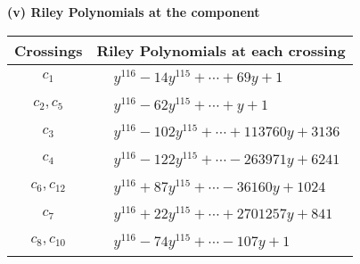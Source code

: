 \documentclass[1p]{elsarticle_modified}
\theoremstyle{definition}
\begin{document}
\newpage\renewcommand{\arraystretch}{1}
\flushleft \textbf{(v) Riley Polynomials at the component}\newline \\
\begin{tabular}{m{50pt}|m{274pt}}
Crossings & \hspace{64pt}Riley Polynomials at each crossing \\
\hline $$\begin{aligned}c_{1}\end{aligned}$$&$\begin{aligned}
&y^{116}-14 y^{115}+\cdots+69 y+1
\end{aligned}$\\
\hline $$\begin{aligned}c_{2},c_{5}\end{aligned}$$&$\begin{aligned}
&y^{116}-62 y^{115}+\cdots+y+1
\end{aligned}$\\
\hline $$\begin{aligned}c_{3}\end{aligned}$$&$\begin{aligned}
&y^{116}-102 y^{115}+\cdots+113760 y+3136
\end{aligned}$\\
\hline $$\begin{aligned}c_{4}\end{aligned}$$&$\begin{aligned}
&y^{116}-122 y^{115}+\cdots-263971 y+6241
\end{aligned}$\\
\hline $$\begin{aligned}c_{6},c_{12}\end{aligned}$$&$\begin{aligned}
&y^{116}+87 y^{115}+\cdots-36160 y+1024
\end{aligned}$\\
\hline $$\begin{aligned}c_{7}\end{aligned}$$&$\begin{aligned}
&y^{116}+22 y^{115}+\cdots+2701257 y+841
\end{aligned}$\\
\hline $$\begin{aligned}c_{8},c_{10}\end{aligned}$$&$\begin{aligned}
&y^{116}-74 y^{115}+\cdots-107 y+1
\end{aligned}$\\

\end{tabular}
\end{document}
